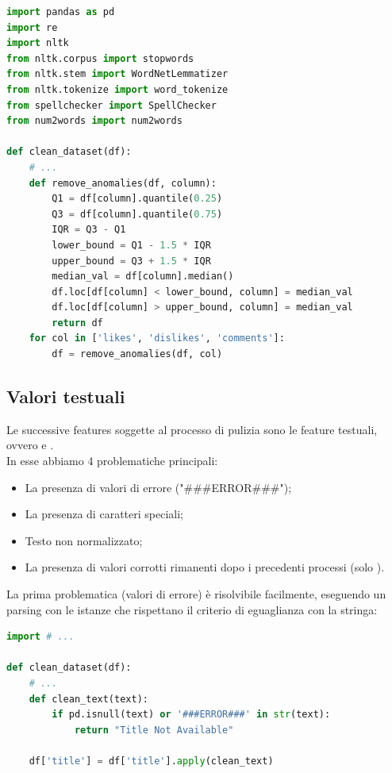 \documentclass[a4paper,12pt]{report}
\begin{document}
\newpage
\begin{lstlisting}[language=Python]
import pandas as pd
import re
import nltk
from nltk.corpus import stopwords
from nltk.stem import WordNetLemmatizer
from nltk.tokenize import word_tokenize
from spellchecker import SpellChecker
from num2words import num2words

def clean_dataset(df):
    # ...
    def remove_anomalies(df, column):
        Q1 = df[column].quantile(0.25)
        Q3 = df[column].quantile(0.75)
        IQR = Q3 - Q1
        lower_bound = Q1 - 1.5 * IQR
        upper_bound = Q3 + 1.5 * IQR
        median_val = df[column].median()
        df.loc[df[column] < lower_bound, column] = median_val
        df.loc[df[column] > upper_bound, column] = median_val
        return df
    for col in ['likes', 'dislikes', 'comments']:
        df = remove_anomalies(df, col)
\end{lstlisting}
\subsection{Valori testuali}
Le successive features soggette al processo di pulizia sono le feature testuali, ovvero \texttt{\color{red}{title}} e \texttt{\color{red}{description}}.\\
In esse abbiamo 4 problematiche principali:
\begin{itemize}
        \item La presenza di valori di errore ("\#\#\#ERROR\#\#\#");
        \item La presenza di caratteri speciali;
        \item Testo non normalizzato;
        \item La presenza di valori corrotti rimanenti dopo i precedenti processi (solo \texttt{\color{red}{title}}).
\end{itemize}
La prima problematica (valori di errore) è risolvibile facilmente, eseguendo un parsing con le istanze che rispettano il criterio di eguaglianza con la stringa:
\begin{lstlisting}[language=Python]
import # ...

def clean_dataset(df):
    # ...
    def clean_text(text):
        if pd.isnull(text) or '###ERROR###' in str(text):
            return "Title Not Available"

    df['title'] = df['title'].apply(clean_text)
\end{lstlisting}
\end{document}
